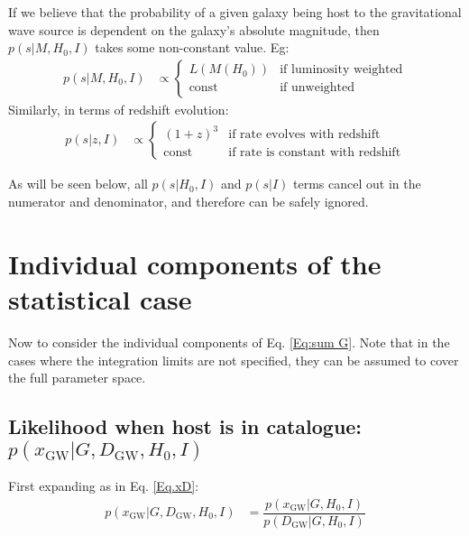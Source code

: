 \documentclass[a4paper,10pt]{article}
\begin{document}
If we believe that the probability of a given galaxy being host to the gravitational wave source is dependent on the galaxy's absolute magnitude, then $p(s|M,H_0,I)$ takes some non-constant value.  Eg:
\begin{equation}
\begin{aligned}
p(s|M,H_0,I) &\propto 
\begin{cases}
L(M(H_0)) & \text{if luminosity weighted}\\
\text{const} & \text{if unweighted}
\end{cases}
\end{aligned}
\end{equation}
Similarly, in terms of redshift evolution:
\begin{equation}
\begin{aligned}
p(s|z,I) &\propto 
\begin{cases}
(1+z)^3 & \text{if rate evolves with redshift}\\
\text{const} & \text{if rate is constant with redshift}
\end{cases}
\end{aligned}
\end{equation}

As will be seen below, all $p(s|H_0,I)$ and $p(s|I)$ terms cancel out in the numerator and denominator, and therefore can be safely ignored.






\section{Individual components of the statistical case \label{Sec: Components}}
Now to consider the individual components of Eq. \ref{Eq:sum G}.  Note that in the cases where the integration limits are not specified, they can be assumed to cover the full parameter space.


\subsection{Likelihood when host is in catalogue: $p(x_{\text{GW}}|G,D_{\text{GW}},H_0,I)$}

First expanding as in Eq. \ref{Eq.xD}:
\begin{equation}
\label{Eq:x_GDH0}
\begin{aligned}
p(x_{\text{GW}}|G,D_{\text{GW}},H_0,I) &= \dfrac{p(x_{\text{GW}}|G,H_0,I)}{p(D_{\text{GW}}|G,H_0,I)}
\end{aligned}
\end{equation}
\end{document}
